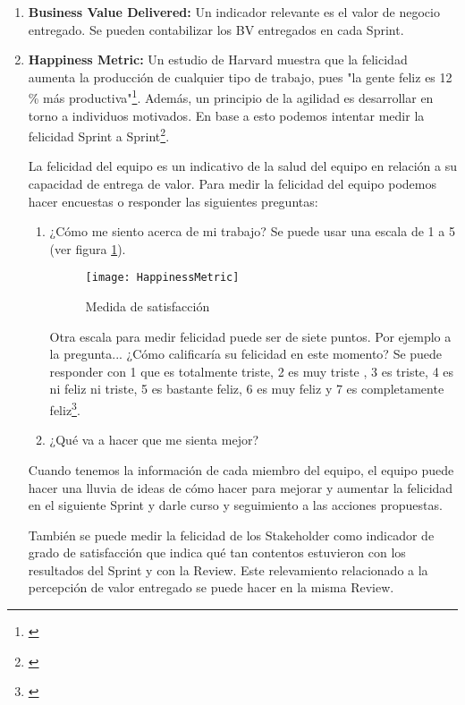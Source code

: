 \begin{enumerate}

\item {\textbf{Business Value Delivered:}
Un indicador relevante es el valor de negocio entregado. Se pueden contabilizar los BV entregados en cada Sprint.
}

\item {\textbf{Happiness Metric:}
Un estudio de Harvard muestra que la felicidad aumenta la producción de cualquier tipo de trabajo, pues "la gente feliz es 12 \% más productiva"\footnote{\cite{U-K-University-2014}}. Además, un principio de la agilidad es desarrollar en torno a individuos motivados. En base a esto podemos intentar medir la felicidad Sprint a Sprint\footnote{\cite{Jeff-2014}}. 

La felicidad del equipo es un indicativo de la salud del equipo en relación a su capacidad de entrega de valor. Para medir la felicidad del equipo podemos hacer encuestas o responder las siguientes preguntas:

  \begin{enumerate}
  \item {¿Cómo me siento acerca de mi trabajo? Se puede usar una escala de 1 a 5 (ver figura \ref{fig:HappinessMetric}). 
  
  \begin{figure}[h]
  \centering
  \texttt{[image: HappinessMetric]}
  \caption{Medida de satisfacción}
  \centering
  \label{fig:HappinessMetric} %
\end{figure}

  Otra escala para medir felicidad puede ser de siete puntos. Por ejemplo a la pregunta... ¿Cómo calificaría su felicidad en este momento? Se puede responder con 1 que es totalmente triste, 2 es muy triste , 3 es triste, 4 es ni feliz ni triste, 5 es bastante feliz, 6 es muy feliz y 7 es completamente feliz\footnote{\cite{U-K-University-2014}}.
  }
  
  \item {¿Qué va a hacer que me sienta mejor?}
  \end{enumerate}

Cuando tenemos la información de cada miembro del equipo, el equipo puede hacer una lluvia de ideas de cómo hacer para mejorar y aumentar la felicidad en el siguiente Sprint y darle curso y seguimiento a las acciones propuestas.

También se puede medir la felicidad de los Stakeholder como indicador de grado de satisfacción que indica qué tan contentos estuvieron con los resultados del Sprint y con la Review. Este relevamiento relacionado a la percepción de valor entregado se puede hacer en la misma Review.

}


\end{enumerate}


